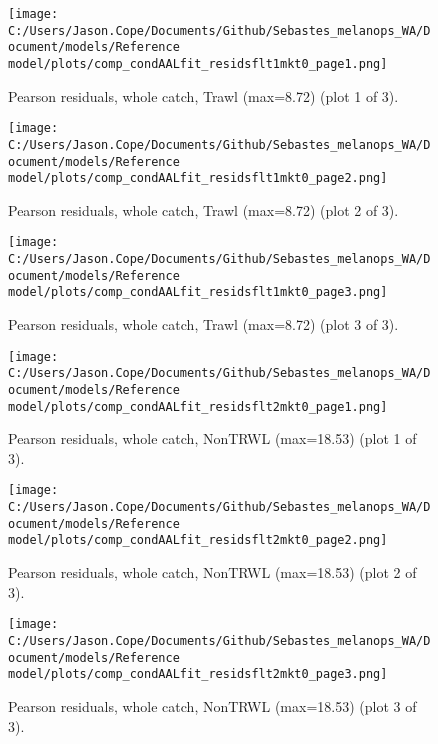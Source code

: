 \documentclass[11pt,
  english,
  letterpaper,
]{article}
\begin{document}
\begin{figure}
\centering
\texttt{[image: C:/Users/Jason.Cope/Documents/Github/Sebastes\_melanops\_WA/Document/models/Reference model/plots/comp\_condAALfit\_residsflt1mkt0\_page1.png]}
\caption{Pearson residuals, whole catch, Trawl (max=8.72) (plot 1 of 3).\label{fig:comp_condAALfit_residsflt1mkt0_page1}}
\end{figure}

\begin{figure}
\centering
\texttt{[image: C:/Users/Jason.Cope/Documents/Github/Sebastes\_melanops\_WA/Document/models/Reference model/plots/comp\_condAALfit\_residsflt1mkt0\_page2.png]}
\caption{Pearson residuals, whole catch, Trawl (max=8.72) (plot 2 of 3).\label{fig:comp_condAALfit_residsflt1mkt0_page2}}
\end{figure}

\begin{figure}
\centering
\texttt{[image: C:/Users/Jason.Cope/Documents/Github/Sebastes\_melanops\_WA/Document/models/Reference model/plots/comp\_condAALfit\_residsflt1mkt0\_page3.png]}
\caption{Pearson residuals, whole catch, Trawl (max=8.72) (plot 3 of 3).\label{fig:comp_condAALfit_residsflt1mkt0_page3}}
\end{figure}

\begin{figure}
\centering
\texttt{[image: C:/Users/Jason.Cope/Documents/Github/Sebastes\_melanops\_WA/Document/models/Reference model/plots/comp\_condAALfit\_residsflt2mkt0\_page1.png]}
\caption{Pearson residuals, whole catch, NonTRWL (max=18.53) (plot 1 of 3).\label{fig:comp_condAALfit_residsflt2mkt0_page1}}
\end{figure}

\begin{figure}
\centering
\texttt{[image: C:/Users/Jason.Cope/Documents/Github/Sebastes\_melanops\_WA/Document/models/Reference model/plots/comp\_condAALfit\_residsflt2mkt0\_page2.png]}
\caption{Pearson residuals, whole catch, NonTRWL (max=18.53) (plot 2 of 3).\label{fig:comp_condAALfit_residsflt2mkt0_page2}}
\end{figure}

\begin{figure}
\centering
\texttt{[image: C:/Users/Jason.Cope/Documents/Github/Sebastes\_melanops\_WA/Document/models/Reference model/plots/comp\_condAALfit\_residsflt2mkt0\_page3.png]}
\caption{Pearson residuals, whole catch, NonTRWL (max=18.53) (plot 3 of 3).\label{fig:comp_condAALfit_residsflt2mkt0_page3}}
\end{figure}
\end{document}
